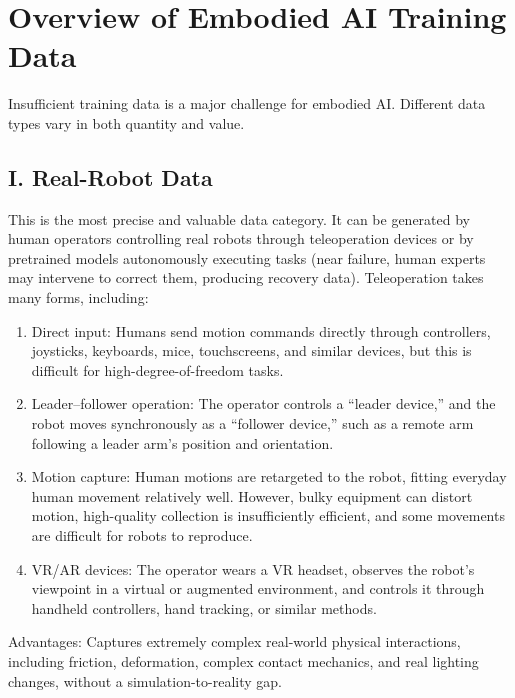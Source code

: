 \setcounter{section}{0}

\hypertarget{overview-of-embodied-ai-training-data}{%
\section{Overview of Embodied AI Training Data}\label{overview-of-embodied-ai-training-data}}

Insufficient training data is a major challenge for embodied AI. Different data types vary in both quantity and value.

\hypertarget{i.-real-robot-data}{%
\subsection{I. Real-Robot Data}\label{i.-real-robot-data}}

This is the most precise and valuable data category. It can be generated by human operators controlling real robots through teleoperation devices or by pretrained models autonomously executing tasks (near failure, human experts may intervene to correct them, producing recovery data). Teleoperation takes many forms, including:

\begin{enumerate}
\def\labelenumi{\arabic{enumi}.}
\item
  Direct input: Humans send motion commands directly through controllers, joysticks, keyboards, mice, touchscreens, and similar devices, but this is difficult for high-degree-of-freedom tasks.
\item
  Leader--follower operation: The operator controls a ``leader device,'' and the robot moves synchronously as a ``follower device,'' such as a remote arm following a leader arm's position and orientation.
\item
  Motion capture: Human motions are retargeted to the robot, fitting everyday human movement relatively well. However, bulky equipment can distort motion, high-quality collection is insufficiently efficient, and some movements are difficult for robots to reproduce.
\item
  VR/AR devices: The operator wears a VR headset, observes the robot's viewpoint in a virtual or augmented environment, and controls it through handheld controllers, hand tracking, or similar methods.
\end{enumerate}

Advantages: Captures extremely complex real-world physical interactions, including friction, deformation, complex contact mechanics, and real lighting changes, without a simulation-to-reality gap.

